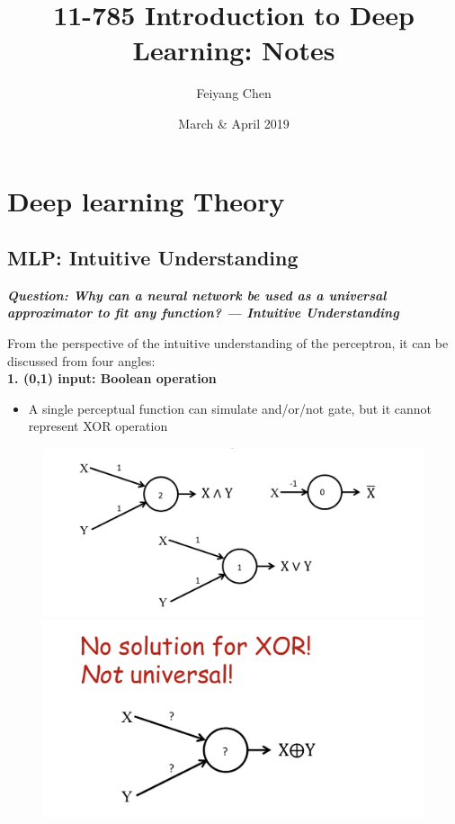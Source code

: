 \documentclass{article}
\title{11-785 Introduction to Deep Learning: Notes}
\author{Feiyang Chen}
\affil{feiyangchen98@gmail.com}
\date{March \& April 2019}
\begin{document}
	
	\maketitle
	
	\tableofcontents
	
	
	\section{Deep learning Theory}
	
	\subsection{MLP: Intuitive Understanding}
	
	\textbf{\textit{Question: Why can a neural network be used as a universal approximator to fit any function? --- Intuitive Understanding}}
	
	From the perspective of the intuitive understanding of the perceptron, it can be discussed from four angles: \\
	

	
	\textbf{1. (0,1) input: Boolean operation}
	
	
	\begin{itemize}
		\item A single perceptual function can simulate and/or/not gate, but it cannot represent XOR operation
	\end{itemize}
	
	\begin{figure}[ht]
		\centering
		\includegraphics[scale=0.2]{1.png}
		\includegraphics[scale=0.2]{2.png}
		
	\end{figure}
	
\end{document}
